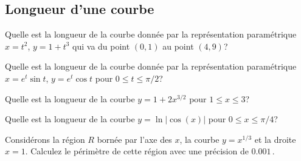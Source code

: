 \subsection{Longueur d'une courbe}

\begin{question}[\eng]
Quelle est la longueur de la courbe donnée par la représentation
paramétrique $x=t^2$, $y=1+t^3$ qui va du point $(0,1)$ au point
$(4,9)$?
\label{13Q2}
\end{question}

\begin{question}[\eng]
Quelle est la longueur de la courbe donnée par la représentation
paramétrique $x = e^t \sin{t}$, $y = e^t \cos{t}$ pour
$0 \leq t \leq \pi/2$?
\label{13Q3}
\end{question}

\begin{question}[\eng]
Quelle est la longueur de la courbe $y = 1 + 2 x^{3/2}$ pour
$1 \leq x \leq 3$?
\label{13Q4}
\end{question}

\begin{question}[\eng]
Quelle est la longueur de la courbe $y = \ln|\cos(x)|$ pour
$0 \leq x \leq \pi/4$?
\label{13Q5}
\end{question}

\begin{question}[\eng]
Considérons la région $R$ bornée par l'axe des $x$, la courbe
$y = x^{1/3}$ et la droite $x = 1$.  Calculez le périmètre de cette
région avec une précision de $0.001$\,.
\label{13Q6}
\end{question}


